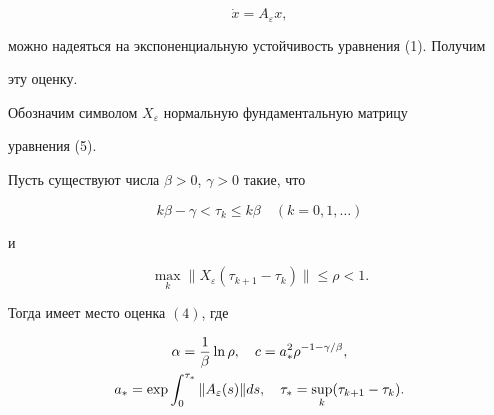 \begin{equation} 


\Dot x=A_\varepsilon x, 


\end{equation} 


можно надеяться на экспоненциальную устойчивость уравнения (1). Получим 


эту оценку. 


 


Обозначим символом $X_\varepsilon$ нормальную фундаментальную матрицу 


уравнения (5). 


 


\begin{thm} 


Пусть существуют числа $\beta>0$, $\gamma>0$ такие, что 


\begin{equation} 


k\beta-\gamma<\tau_k\le k\beta\quad (k=0,1,\dotsc) 


\end{equation} 


и 


\begin{equation} 


\max_k\|X_\varepsilon(\tau_{k+1}-\tau_k)\|\le\rho<1. 


\end{equation} 


Тогда имеет место оценка $(4)$, где 


\begin{gather} 


\alpha=\frac{1}{\beta}\ln\rho,\quad 


c=a^2_*\rho^{-1-\gamma/\beta},\\ 


a_*=\exp\int^{\tau_*}_0\|A_\varepsilon(s)\|ds,\quad 


\tau_*=\sup_k(\tau_{k+1}-\tau_k).\notag 


\end{gather} 


\end{thm} 


 


